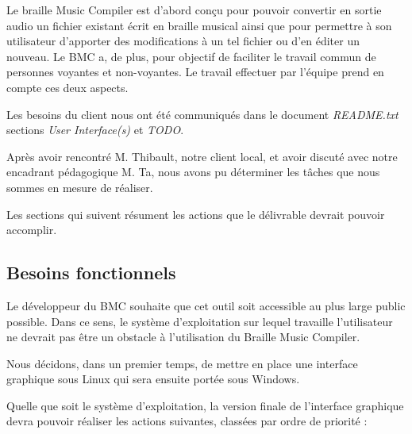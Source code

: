 
Le braille Music Compiler est d'abord conçu pour pouvoir convertir en sortie audio un fichier existant écrit en braille musical ainsi que pour permettre à son utilisateur d'apporter des modifications à un tel fichier ou d'en éditer un nouveau. Le BMC a, de plus, pour objectif de faciliter le travail commun de personnes voyantes et non-voyantes.
Le travail effectuer par l'équipe prend en compte ces deux aspects.

Les besoins du client nous ont été communiqués dans le document \textit{README.txt} sections \textit{User Interface(s)} et \textit{TODO}.

Après avoir rencontré M. Thibault, notre client local, et avoir discuté avec notre encadrant pédagogique M. Ta, nous avons pu déterminer les tâches que nous sommes en mesure de réaliser. 

Les sections qui suivent résument les actions que le délivrable devrait pouvoir accomplir.


\subsection{Besoins fonctionnels}
Le développeur du BMC souhaite que cet outil soit accessible au plus large public possible. Dans ce sens, le système d'exploitation sur lequel travaille l'utilisateur ne devrait pas être un obstacle à l'utilisation du Braille Music Compiler.

Nous décidons, dans un premier temps, de mettre en place une interface graphique sous Linux qui sera ensuite portée sous Windows.
 
Quelle que soit le système d'exploitation, la version finale de l'interface graphique devra pouvoir réaliser les actions suivantes, classées par ordre de priorité : \\


